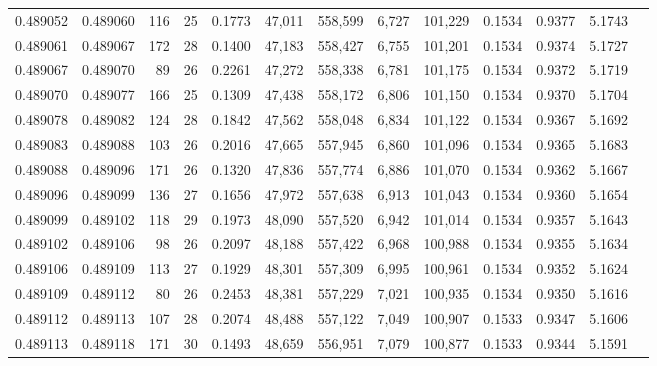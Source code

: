 \begin{tabular}{rrrrrrrrrrrrr}
0.489052 & 0.489060 & 116 &  25 &                                     0.1773 &  47,011 & 558,599 &   6,727 & 101,229 & 0.1534 & 0.9377 & 5.1743 \\
0.489061 & 0.489067 & 172 &  28 &                                     0.1400 &  47,183 & 558,427 &   6,755 & 101,201 & 0.1534 & 0.9374 & 5.1727 \\
0.489067 & 0.489070 &  89 &  26 &                                     0.2261 &  47,272 & 558,338 &   6,781 & 101,175 & 0.1534 & 0.9372 & 5.1719 \\
0.489070 & 0.489077 & 166 &  25 &                                     0.1309 &  47,438 & 558,172 &   6,806 & 101,150 & 0.1534 & 0.9370 & 5.1704 \\
0.489078 & 0.489082 & 124 &  28 &                                     0.1842 &  47,562 & 558,048 &   6,834 & 101,122 & 0.1534 & 0.9367 & 5.1692 \\
0.489083 & 0.489088 & 103 &  26 &                                     0.2016 &  47,665 & 557,945 &   6,860 & 101,096 & 0.1534 & 0.9365 & 5.1683 \\
0.489088 & 0.489096 & 171 &  26 &                                     0.1320 &  47,836 & 557,774 &   6,886 & 101,070 & 0.1534 & 0.9362 & 5.1667 \\
0.489096 & 0.489099 & 136 &  27 &                                     0.1656 &  47,972 & 557,638 &   6,913 & 101,043 & 0.1534 & 0.9360 & 5.1654 \\
0.489099 & 0.489102 & 118 &  29 &                                     0.1973 &  48,090 & 557,520 &   6,942 & 101,014 & 0.1534 & 0.9357 & 5.1643 \\
0.489102 & 0.489106 &  98 &  26 &                                     0.2097 &  48,188 & 557,422 &   6,968 & 100,988 & 0.1534 & 0.9355 & 5.1634 \\
0.489106 & 0.489109 & 113 &  27 &                                     0.1929 &  48,301 & 557,309 &   6,995 & 100,961 & 0.1534 & 0.9352 & 5.1624 \\
0.489109 & 0.489112 &  80 &  26 &                                     0.2453 &  48,381 & 557,229 &   7,021 & 100,935 & 0.1534 & 0.9350 & 5.1616 \\
0.489112 & 0.489113 & 107 &  28 &                                     0.2074 &  48,488 & 557,122 &   7,049 & 100,907 & 0.1533 & 0.9347 & 5.1606 \\
0.489113 & 0.489118 & 171 &  30 &                                     0.1493 &  48,659 & 556,951 &   7,079 & 100,877 & 0.1533 & 0.9344 & 5.1591 \\

\end{tabular}
